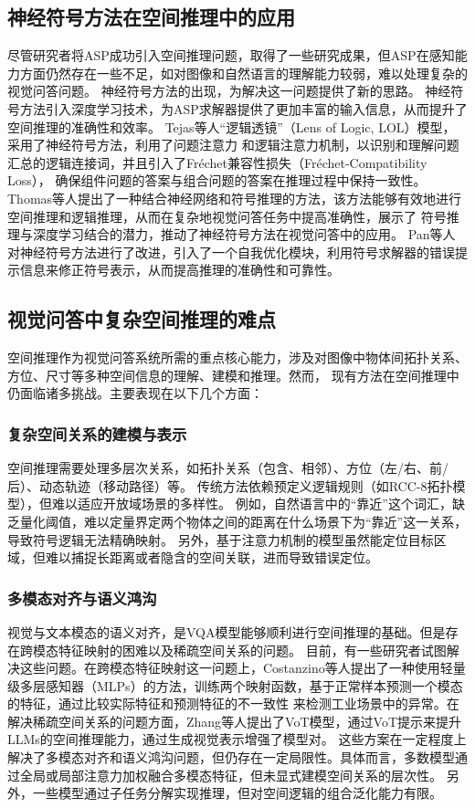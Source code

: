\subsection{神经符号方法在空间推理中的应用}
尽管研究者将ASP成功引入空间推理问题，取得了一些研究成果，但ASP在感知能力方面仍然存在一些不足，如对图像和自然语言的理解能力较弱，难以处理复杂的视觉问答问题。
神经符号方法的出现，为解决这一问题提供了新的思路。
神经符号方法引入深度学习技术，为ASP求解器提供了更加丰富的输入信息，从而提升了空间推理的准确性和效率。
Tejas\cite{Gokhale2020CausalVQA}等人“逻辑透镜”（Lens of Logic, LOL）模型，采用了神经符号方法，利用了问题注意力
和逻辑注意力机制，以识别和理解问题汇总的逻辑连接词，并且引入了Fréchet兼容性损失（Fréchet-Compatibility Loss），
确保组件问题的答案与组合问题的答案在推理过程中保持一致性。
Thomas\cite{eiter2022neuro}等人提出了一种结合神经网络和符号推理的方法，该方法能够有效地进行空间推理和逻辑推理，从而在复杂地视觉问答任务中提高准确性，展示了
符号推理与深度学习结合的潜力，推动了神经符号方法在视觉问答中的应用。
Pan\cite{pan2023logic}等人对神经符号方法进行了改进，引入了一个自我优化模块，利用符号求解器的错误提示信息来修正符号表示，从而提高推理的准确性和可靠性。

\subsection{视觉问答中复杂空间推理的难点}
空间推理作为视觉问答系统所需的重点核心能力，涉及对图像中物体间拓扑关系、方位、尺寸等多种空间信息的理解、建模和推理。然而，
现有方法在空间推理中仍面临诸多挑战。主要表现在以下几个方面：

\subsubsection{复杂空间关系的建模与表示}
空间推理需要处理多层次关系，如拓扑关系（包含、相邻）、方位（左/右、前/后）、动态轨迹（移动路径）等。
传统方法依赖预定义逻辑规则（如RCC-8拓扑模型），但难以适应开放域场景的多样性\cite{li2021algorithm}。
例如，自然语言中的“靠近”这个词汇，缺乏量化阈值，难以定量界定两个物体之间的距离在什么场景下为“靠近”这一关系，导致符号逻辑无法精确映射\cite{shrestha2019answer}。
另外，基于注意力机制的模型虽然能定位目标区域，但难以捕捉长距离或者隐含的空间关联，进而导致错误定位。

\subsubsection{多模态对齐与语义鸿沟}
视觉与文本模态的语义对齐，是VQA模型能够顺利进行空间推理的基础。但是存在跨模态特征映射的困难以及稀疏空间关系的问题。
目前，有一些研究者试图解决这些问题。在跨模态特征映射这一问题上，Costanzino\cite{Costanzino2024MultimodalIA}等人提出了一种使用轻量级多层感知器（MLPs）的方法，训练两个映射函数，基于正常样本预测一个模态的特征，通过比较实际特征和预测特征的不一致性
来检测工业场景中的异常。在解决稀疏空间关系的问题方面，Zhang\cite{wu2024minds}等人提出了VoT模型，通过VoT提示来提升LLMs的空间推理能力，通过生成视觉表示增强了模型对。
这些方案在一定程度上解决了多模态对齐和语义鸿沟问题，但仍存在一定局限性。具体而言，多数模型通过全局或局部注意力加权融合多模态特征，但未显式建模空间关系的层次性。
另外，一些模型通过子任务分解实现推理，但对空间逻辑的组合泛化能力有限。

